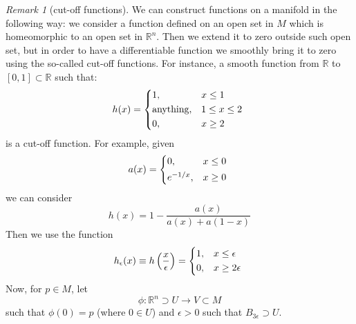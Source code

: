 \documentclass[a4paper,11pt,titlepage, article, oneside]{memoir}
\numberwithin{equation}{section}
\theoremstyle{definition}
\theoremstyle{remark}
\newtheorem{remark}[theorem]{Remark}
\newcommand{\rfield}{\mathbb{R}}
\begin{document}
\begin{remarkbox}\begin{remark}[cut-off functions]
  We can construct functions on a manifold in the following way: we consider a function defined on an open set in $M$ which is homeomorphic to an open set in $\rfield^n$. Then we extend it to zero outside such open set, but in order to have a differentiable function we smoothly bring it to zero using the so-called cut-off functions.
  For instance, a smooth function from $\rfield$ to $[0, 1] \subset \rfield$ such that:
  \begin{equation*}
    h(x) = \begin{cases*}
     1, & $x \le 1$ \\
     \text{anything}, &  $1 \le x \le 2$ \\
     0, & $x \ge 2$
  \end{cases*}
  \end{equation*}
  is a cut-off function.
  For example, given
  \begin{equation*}
    a(x) = \begin{cases*}
     0, & $x \le 0$ \\
     e^{-1/x}, & $x \ge 0$
  \end{cases*}
  \end{equation*}
  we can consider
  \begin{equation*}
    h(x) = 1 - \frac{a(x)}{a(x) + a(1-x)}
  \end{equation*}
  Then we use the function
  \begin{equation*}
    h_{\epsilon}(x) \equiv h \left (\frac{x}{\epsilon} \right) =
    \begin{cases*}
      1, & $x \le \epsilon$ \\
      0, & $x \ge 2 \epsilon$
    \end{cases*}
  \end{equation*}
  Now, for $p \in M$, let
  $$\phi \colon \rfield^n \supset U \rightarrow V \subset M$$
  such that $\phi(0) = p$ (where $0 \in U$) and $\epsilon > 0$ such that $B_{3 \epsilon} \supset U $. %

  \begin{figure}[H]
          \centering
\end{figure}
\end{remark}
\end{remarkbox}
\end{document}
